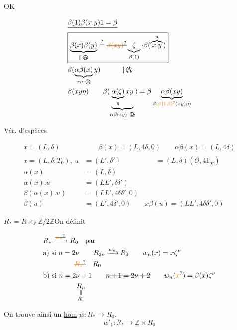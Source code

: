 OK

\[
\begin{aligned}
&\deleted{\beta(1)\beta(x.y)1=\beta}\\[-2pt]
&\boxed{\underbrace{\beta(x)\beta(y)}_{\Vert\,\text{\textcircled{A}}}\overset?=\deleted{\unsure{\beta(xy)}}\underbrace{\zeta}_{\beta(1)}\cdot\beta(\overbrace{x.y}^{u})}\\
&\beta(\underbrace{\alpha\beta(x)}_{x\eta\ \text{\textcircled{B}}}y)\qquad\quad\Vert\,\text{\textcircled{A}}\\
&\beta(xy\eta)\qquad
\beta(\underbrace{\underbrace{\alpha(\zeta)}_{\eta}xy}_{\alpha\beta(xy)\ \text{\textcircled{B}}})=\beta\underbrace{\alpha\beta(xy)}_{\beta\unsure{(\beta|1\,\beta)}(xy)\eta)}
\end{aligned}
\]

Vér.  d'espèces

\[
\begin{aligned}
\underline{x=(L,\delta)}&\qquad\beta(x)=(L,4\delta,0)\qquad\alpha\beta(x)=(L,4\delta)\\
x=(L,\delta,T_0),\ u&=(L',\delta')\qquad\qquad\quad=(L,\delta)(\underline{\mathcal O},4\underline1_X)\\
\alpha(x)&=(L,\delta)\\
\alpha(x).u&=(LL',\delta\delta')\\
\beta(\alpha(x).u)&=(LL',4\delta\delta',0)\\
\beta(u)&=(L',4\delta',0)\qquad x\beta(u)=(LL',4\delta\delta',0)
\end{aligned}
\]

$R_\ast=R\times_{\mathbb Z}\mathbb Z/2\mathbb Z$\qquad On définit

\[
\begin{aligned}
&R_\ast\xrightarrow{\deleted{\unsure{w_n}}} R_0\quad\text{par}\\
&\text{a) si }n=2\nu\qquad R_{2\nu}\xrightarrow{w_n} R_0\qquad w_n(x)=x\zeta^\nu\\
&\hspace{45pt}\deleted{\unsure{R_1}}\quad R_0\\
&\text{b) si }n=2\nu+1\qquad\deleted{n+1=2\nu+2}\qquad w_n(\unsure{x})=\beta(x)\zeta^\nu\\
&\hspace{48pt}\underset{R_1}{\underset{\Vert}{R_n}}
\end{aligned}
\]

On trouve ainsi un \uline{hom} $w:R_\ast\longrightarrow R_0$. 
\[w'_1:R_\ast\longrightarrow\mathbb Z\times R_0\]

